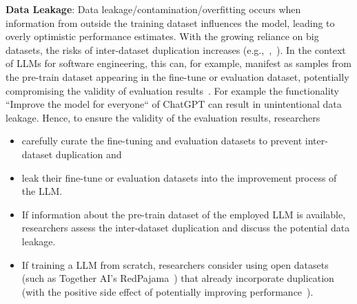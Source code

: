 \textbf{Data Leakage}:
Data leakage/contamination/overfitting occurs when information from outside the training dataset influences the model, leading to overly optimistic performance estimates. With the growing reliance on big datasets, the risks of inter-dataset duplication increases (e.g.,~\cite{DBLP:journals/pacmpl/LopesMMSYZSV17},~\cite{DBLP:conf/oopsla/Allamanis19}). 
In the context of LLMs for software engineering, this can, for example, manifest as samples from the pre-train dataset appearing in the fine-tune or evaluation dataset, potentially compromising the validity of evaluation results~\cite{DBLP:journals/tse/LopezCSSV25}. For example the functionality ``Improve the model for everyone`` of ChatGPT can result in unintentional data leakage.
Hence, to ensure the validity of the evaluation results, researchers
\begin{itemize}
  \item \should carefully curate the fine-tuning and evaluation datasets to prevent inter-dataset duplication and
  \item \mustnot leak their fine-tune or evaluation datasets into the improvement process of the LLM.
  \item If information about the pre-train dataset of the employed LLM is available, researchers \should assess the inter-dataset duplication and \must discuss the potential data leakage.
  \item If training a LLM from scratch, researchers \may consider using open datasets (such as Together AI's RedPajama~\cite{together2023redpajama}) that already incorporate duplication (with the positive side effect of potentially improving performance~\cite{DBLP:conf/acl/LeeINZECC22}).
\end{itemize}

